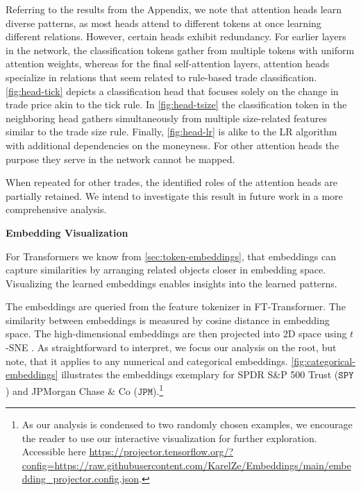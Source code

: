 Referring to the results from the Appendix, we note that attention heads learn diverse patterns, as most heads attend to different tokens at once learning different relations. However, certain heads exhibit redundancy. For earlier layers in the network, the classification tokens gather from multiple tokens with uniform attention weights, whereas for the final self-attention layers, attention heads specialize in relations that seem related to rule-based trade classification. \cref{fig:head-tick} depicts a classification head that focuses solely on the change in trade price akin to the tick rule. In \cref{fig:head-tsize} the classification token in the neighboring head gathers simultaneously from multiple size-related features similar to the trade size rule. Finally, \cref{fig:head-lr} is alike to the \gls{LR} algorithm with additional dependencies on the moneyness. For other attention heads the purpose they serve in the network cannot be mapped. 

When repeated for other trades, the identified roles of the attention heads are partially retained. We intend to investigate this result in future work in a more comprehensive analysis.

\textbf{Embedding Visualization}

For Transformers we know from \cref{sec:token-embeddings}, that embeddings can capture similarities by arranging related objects closer in embedding space. Visualizing the learned embeddings enables insights into the learned patterns.

The embeddings are queried from the feature tokenizer in FT-Transformer. The similarity between embeddings is measured by cosine distance in embedding space. The high-dimensional embeddings are then projected into 2D space using $t$-SNE \autocite[][2587]{vandermaatenVisualizingDataUsing2008}. As straightforward to interpret, we focus our analysis on the root, but note, that it applies to any numerical and categorical embeddings. \cref{fig:categorical-embeddings} illustrates the embeddings exemplary for SPDR S\&P 500 Trust ($\mathtt{SPY}$) and JPMorgan Chase \& Co ($\mathtt{JPM}$).\footnote{As our analysis is condensed to two randomly chosen examples, we encourage the reader to use our interactive visualization for further exploration. Accessible here \url{https://projector.tensorflow.org/?config=https://raw.githubusercontent.com/KarelZe/Embeddings/main/embedding_projector.config.json}.}


